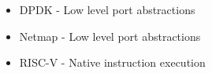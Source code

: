 \begin{itemize}
  \item DPDK - Low level port abstractions
  \item Netmap - Low level port abstractions
  \item RISC-V - Native instruction execution
\end{itemize}

%
%

